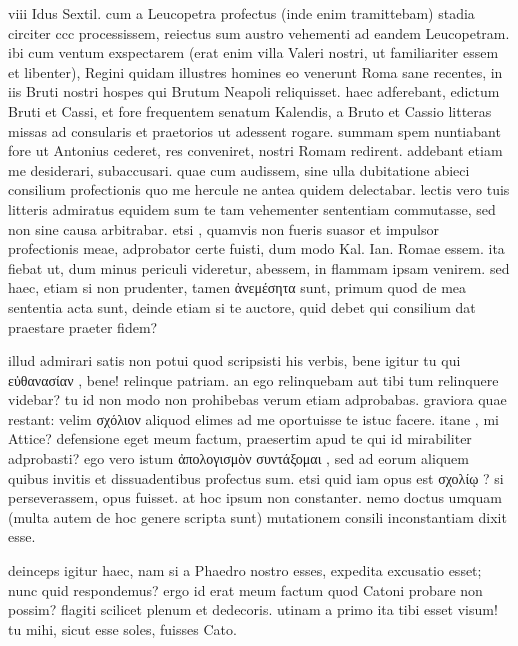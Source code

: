 


 viii Idus Sextil. cum a Leucopetra profectus (inde enim tramittebam) stadia circiter ccc processissem, reiectus sum austro vehementi ad eandem Leucopetram. ibi cum ventum exspectarem (erat enim villa Valeri nostri, ut familiariter essem et libenter), Regini quidam illustres homines eo venerunt Roma sane recentes, in iis Bruti nostri hospes qui Brutum Neapoli reliquisset. haec adferebant, edictum Bruti et Cassi, et fore frequentem senatum Kalendis, a Bruto et Cassio litteras missas ad consularis et praetorios ut adessent rogare. summam spem nuntiabant fore ut Antonius cederet, res conveniret, nostri Romam redirent. addebant etiam me desiderari, subaccusari. quae cum audissem, sine ulla dubitatione abieci consilium profectionis quo me hercule ne antea quidem delectabar. lectis vero tuis litteris admiratus equidem sum te tam vehementer sententiam commutasse, sed non sine causa arbitrabar. etsi , quamvis non fueris suasor et impulsor profectionis meae, adprobator certe fuisti, dum modo Kal. Ian. Romae essem. ita fiebat ut, dum minus periculi videretur, abessem, in flammam ipsam venirem. sed haec, etiam si non prudenter, tamen ἀνεμέσητα sunt, primum quod de mea sententia acta sunt, deinde etiam si te auctore, quid debet qui consilium dat praestare praeter fidem?

 illud admirari satis non potui quod scripsisti his verbis, bene igitur tu qui εὐθανασίαν , bene! relinque patriam. an ego relinquebam aut tibi tum relinquere videbar? tu id non modo non prohibebas verum etiam adprobabas. graviora quae restant: velim σχόλιον aliquod elimes ad me oportuisse te istuc facere. itane , mi Attice? defensione eget meum factum, praesertim apud te qui id mirabiliter adprobasti? ego vero istum ἀπολογισμὸν συντάξομαι , sed ad eorum aliquem quibus invitis et dissuadentibus profectus sum. etsi quid iam opus est σχολίῳ ? si perseverassem, opus fuisset. at hoc ipsum non constanter. nemo doctus umquam (multa autem de hoc genere scripta sunt) mutationem consili inconstantiam dixit esse.

 deinceps igitur haec, nam si a Phaedro nostro esses, expedita excusatio esset; nunc quid respondemus? ergo id erat meum factum quod Catoni probare non possim? flagiti scilicet plenum et dedecoris. utinam a primo ita tibi esset visum! tu mihi, sicut esse soles, fuisses Cato.

